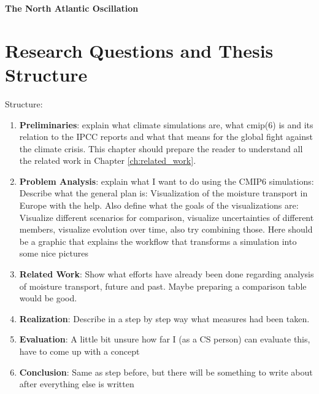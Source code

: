 \textbf{The North Atlantic Oscillation}




 
\section{Research Questions and Thesis Structure}
\label{sec:research_questions}


Structure:

\begin{enumerate}
  \item \textbf{Preliminaries}: explain what climate simulations are, what cmip(6) is and its relation to the IPCC reports and what that means for the global fight against the climate crisis. 
    This chapter should prepare the reader to understand all the related work in Chapter \ref{ch:related_work}.
  \item \textbf{Problem Analysis}: explain what I want to do using the CMIP6 simulations: Describe what the general plan is: Visualization of the moisture transport in Europe with the help. 
    Also define what the goals of the visualizations are: Visualize different scenarios for comparison, visualize uncertainties of different members, visualize evolution over time, also try combining those. 
    Here should be a graphic that explains the workflow that transforms a simulation into some nice pictures
  \item \textbf{Related Work}: Show what efforts have already been done regarding analysis of moisture transport, future and past. 
    Maybe preparing a comparison table would be good. 
  \item \textbf{Realization}: Describe in a step by step way what measures had been taken. 
  \item \textbf{Evaluation}: A little bit unsure how far I (as a CS person) can evaluate this, have to come up with a concept
  \item \textbf{Conclusion}: Same as step before, but there will be something to write about after everything else is written
  
\end{enumerate}

